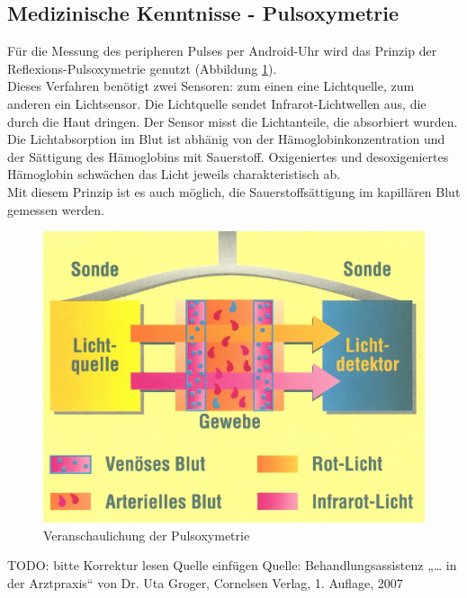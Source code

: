 \subsection{Medizinische Kenntnisse - Pulsoxymetrie} 
Für die Messung des peripheren Pulses per Android-Uhr wird das Prinzip der Reflexions-Pulsoxymetrie genutzt (Abbildung \ref{pic:pulsoxy}).\\
Dieses Verfahren benötigt zwei Sensoren: zum einen eine Lichtquelle, zum anderen ein Lichtsensor. Die Lichtquelle sendet Infrarot-Lichtwellen aus, die durch die Haut dringen. Der Sensor misst die Lichtanteile, die absorbiert wurden. \\
Die Lichtabsorption im Blut ist abhänig von der Hämoglobinkonzentration und der Sättigung des Hämoglobins mit Sauerstoff. Oxigeniertes und desoxigeniertes Hämoglobin schwächen das Licht jeweils charakteristisch ab. \\
Mit diesem Prinzip ist es auch möglich, die Sauerstoffsättigung im kapillären Blut gemessen werden\cite{behandlungsassitenz}.
\begin{figure}[H]
	\centering
	\includegraphics[scale=1.0]{images/pulsoxy.jpg}
	\caption{Veranschaulichung der Pulsoxymetrie\cite{messprinzip-pulsoxi}}
	\label{pic:pulsoxy}
\end{figure}

TODO:
bitte Korrektur lesen
Quelle einfügen
Quelle: Behandlungsassistenz „… in der Arztpraxis“ von Dr. Uta Groger, Cornelsen Verlag, 1. Auflage, 2007



